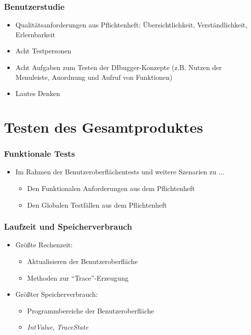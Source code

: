 \documentclass{beamer}
\begin{document}
\begin{frame}
\frametitle{Benutzerstudie}
\begin{itemize}
    \item Qualitätsanforderungen aus Pflichtenheft: Übersichtlichkeit, Verständlichkeit, Erlernbarkeit
    \item Acht Testpersonen
    \item Acht Aufgaben zum Testen der DIbugger-Konzepte (z.B. Nutzen der Menuleiste, Anordnung und Aufruf von Funktionen)
    \item Lautes Denken
\end{itemize}
\end{frame}

\section{Testen des Gesamtproduktes} 

\begin{frame}
\frametitle{Funktionale Tests}
\begin{itemize}
    \item Im Rahmen der Benutzeroberflächentests und weitere Szenarien zu ...
    \begin{itemize}
        \item Den Funktionalen Anforderungen aus dem Pflichtenheft
        \item Den Globalen Testfällen aus dem Pflichtenheft
    \end{itemize}
\end{itemize}
\end{frame}

\begin{frame}
\frametitle{Laufzeit und Speicherverbrauch}
\begin{itemize}
    \item Größte Rechenzeit:
    \begin{itemize}
        \item Aktualisieren der Benutzeroberfläche
        \item Methoden zur \enquote{Trace}-Erzeugung
    \end{itemize}
    \item Größter Speicherverbrauch:
    \begin{itemize}
        \item Programmbereiche der Benutzeroberfläche
        \item \textit{IntValue}, \textit{TraceState}
    \end{itemize}
\end{itemize}
\end{frame}
\end{document}
